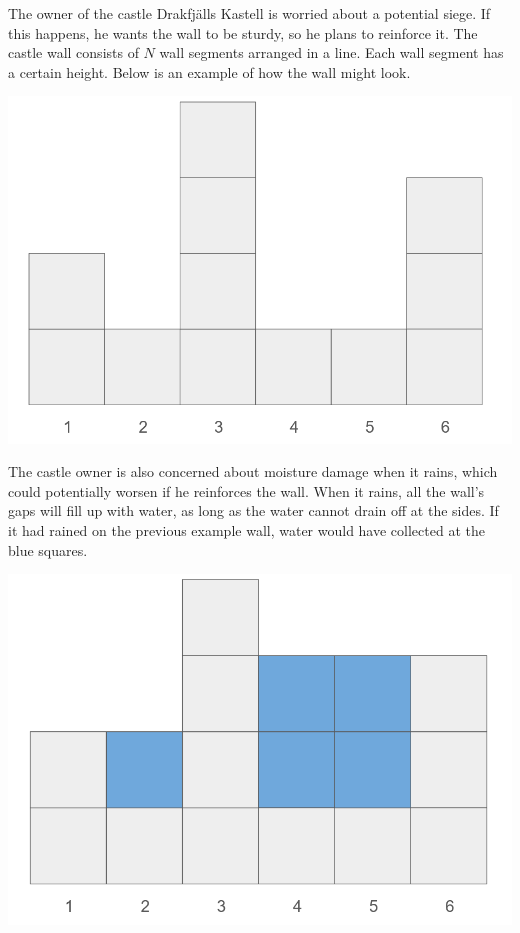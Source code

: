 
\noindent

The owner of the castle Drakfjälls Kastell is worried about a potential siege. If this happens, he wants the wall to be sturdy, 
so he plans to reinforce it. The castle wall consists of $N$ wall segments arranged in a line. Each wall segment has 
a certain height. Below is an example of how the wall might look.

\begin{center}
  \includegraphics[scale=0.3]{mur1.png}
\end{center}

The castle owner is also concerned about moisture damage when it rains, which could potentially worsen 
if he reinforces the wall. When it rains, all the wall's gaps will fill up with water, as long as the 
water cannot drain off at the sides. If it had rained on the previous example wall, water would have 
collected at the blue squares.

\begin{center}
  \includegraphics[scale=0.3]{mur2.png}
\end{center}

